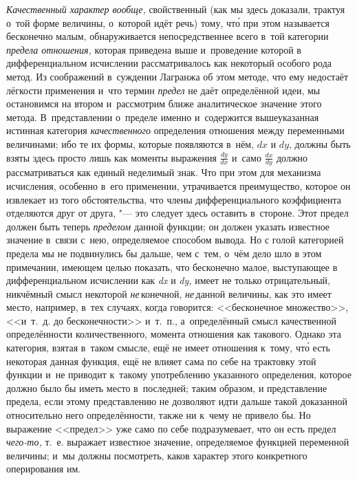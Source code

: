 {\em Качественный характер вообще,} свойственный (как мы здесь доказали,
трактуя о~той форме величины, о~которой идёт речь) тому, чт\'{о} при этом
называется бесконечно малым, обнаруживается непосредственнее всего в~той
категории {\em предела отношения,} которая приведена выше и~проведение которой
в дифференциальном исчислении рассматривалось как некоторый особого рода метод.
Из соображений в~суждении Лагранжа об этом методе, что ему недостаёт лёгкости
применения и~что термин {\em предел} не даёт определённой идеи, мы
остановимся на втором и~рассмотрим ближе аналитическое значение этого метода.
В~представлении о~пределе именно и~содержится вышеуказанная истинная категория
{\em качественного} определения отношения между переменными величинами; ибо те
их формы, которые появляются в~нём, $dx$ и $dy$, должны быть взяты
здесь просто лишь как моменты выражения $\frac{dy}{dx}$ и~само $\frac{dx}{dy}$
должно рассматриваться как единый неделимый знак. Что при этом для механизма
исчисления, особенно в~его применении, утрачивается преимущество, которое он
извлекает из того обстоятельства, что члены дифференциального коэффициента
отделяются друг от друга, "--- это следует здесь оставить в~стороне. Этот
предел должен быть теперь {\em пределом} данной функции; он должен
указать известное значение в~связи с~нею, определяемое способом вывода. Но с
голой категорией предела мы не подвинулись бы дальше, чем с~тем, о~чём дело шло
в этом примечании, имеющем целью показать, что бесконечно малое, выступающее в
дифференциальном исчислении как {\em dx} и {\em dy,} имеет не только
отрицательный, никчёмный смысл некоторой {\em не}\,конечной, {\em не}\,данной
величины, как это имеет место, например, в~тех случаях, когда говорится:
<<бесконечное множество>>, <<и~т.~д. до бесконечности>> и~т.~п., а~определённый
смысл качественной определённости количественного, момента отношения как
такового. Однако эта категория, взятая в~таком смысле, ещё не имеет отношения
к~тому, чт\'{о} есть некоторая данная функция, ещё не влияет сама по себе на
трактовку этой функции и~не приводит к~такому употреблению указанного
определения, которое должно было бы иметь место в~последней; таким образом, и
представление предела, если этому представлению не дозволяют идти дальше такой
доказанной относительно него определённости, также ни к~чему не привело бы. Но
выражение <<предел>> уже само по себе подразумевает, что он есть предел
{\em чего-то,} т.~е. выражает известное значение, определяемое функцией
переменной величины; и~мы должны посмотреть, каков характер этого конкретного
оперирования им.

